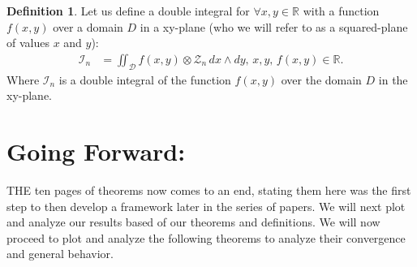 \documentclass[10pt]{article}
\theoremstyle{plain}
\theoremstyle{definition}
\newtheorem{definition}[theorem]{Definition}
\theoremstyle{remark}
\begin{document}
\begin{definition}
	Let us define a double integral for $\forall x, y \in \mathbb{R}$ with a function $f(x, y)$ over a domain $D$ in a xy-plane (who we will refer to as a squared-plane of values $x$ and $y$):
	\begin{align*}
		\mathcal{I}_n &= \iint_{\mathcal{D}} f(x, y) \otimes \mathcal{Z}_n \, dx \land dy, \, x, y, \, f(x, y) \in \mathbb{R}.
	\end{align*}
	Where $\mathcal{I}_n$ is a double integral of the function $f(x, y)$ over the domain $D$ in the xy-plane.
\end{definition}

\section{Going Forward:}

\lettrine[lines=2, lhang=0.1, loversize=0.2]{T}HE ten pages of theorems now comes to an end, stating them here was the first step to then develop a framework later in the series of papers. We will next plot and analyze our results based of our theorems and definitions. We will now proceed to plot and analyze the following theorems to analyze their convergence and general behavior.

\nocite{*}




\end{document}
